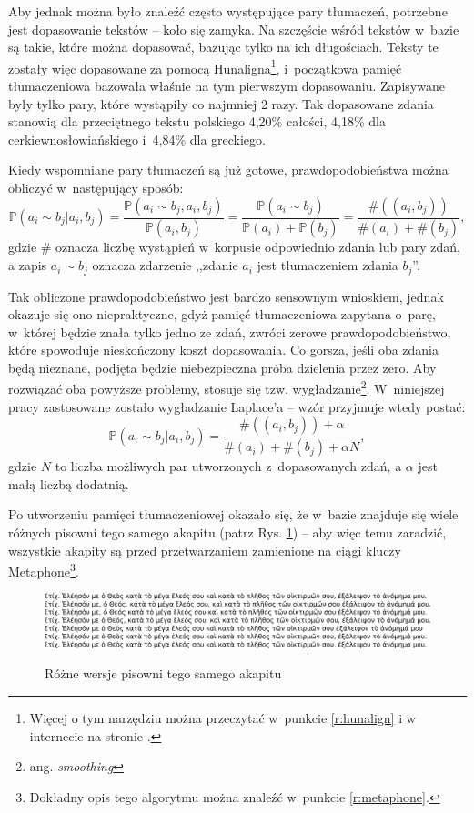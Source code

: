 \documentclass{pracamgr}
\begin{document}
Aby jednak można było znaleźć często występujące pary tłumaczeń,
potrzebne jest dopasowanie tekstów -- koło się zamyka. Na szczęście
wśród tekstów w~bazie są takie, które można dopasować, bazując tylko
na ich długościach. Teksty te zostały więc dopasowane za pomocą
Hunaligna\footnote{Więcej o tym narzędziu można przeczytać w~punkcie
  \ref{r:hunalign} i w internecie na stronie \cite{hunalign}.},
i~początkowa pamięć tłumaczeniowa bazowała właśnie na tym pierwszym
dopasowaniu. Zapisywane były tylko pary, które wystąpiły co najmniej 2
razy. Tak dopasowane zdania stanowią dla przeciętnego tekstu polskiego
4,20\% całości, 4,18\% dla cerkiewno\-{}słowiańskiego i~4,84\% dla
greckiego.

Kiedy wspomniane pary tłumaczeń są już gotowe, prawdopodobieństwa
można obliczyć w~następujący sposób:
$$
\mathbb{P}( a_i \sim b_j | a_i, b_j)
=
\frac{ \mathbb{P}( a_i \sim b_j, a_i, b_j)}
     { \mathbb{P}( a_i, b_j) }
=
\frac{ \mathbb{P}( a_i \sim b_j ) }
     { \mathbb{P}(a_i) +  \mathbb{P}(b_j) }
=
\frac{ \#( (a_i, b_j) ) }
     { \#(a_i) + \#(b_j) } ,
$$
gdzie $\#$ oznacza liczbę wystąpień w~korpusie odpowiednio zdania lub
pary zdań, a zapis $a_i \sim b_j$ oznacza zdarzenie ,,zdanie $a_i$ jest
tłumaczeniem zdania $b_j$''.

Tak obliczone prawdopodobieństwo jest bardzo sensownym wnioskiem,
jednak okazuje się ono niepraktyczne, gdyż pamięć tłumaczeniowa
zapytana o~parę, w~której będzie znała tylko jedno ze zdań, zwróci
zerowe prawdopodobieństwo, które spowoduje nieskończony koszt
dopasowania. Co gorsza, jeśli oba zdania będą nieznane, podjęta będzie
niebezpieczna próba dzielenia przez zero. Aby rozwiązać oba powyższe
problemy, stosuje się
tzw. wygładzanie\footnote{ang. \textit{smoothing}}. W~niniejszej pracy
zastosowane zostało wygładzanie Laplace’a -- wzór przyjmuje wtedy
postać:
$$
\mathbb{P}( a_i \sim b_j | a_i, b_j)
=
\frac{ \#( (a_i, b_j) ) + \alpha }
     { \#(a_i) + \#(b_j) + \alpha N } ,
$$
gdzie $N$ to liczba możliwych par utworzonych z~dopasowanych zdań, a
$\alpha$ jest małą liczbą dodatnią.

Po utworzeniu pamięci tłumaczeniowej okazało się, że w~bazie znajduje
się wiele różnych pisowni tego samego akapitu (patrz
Rys. \ref{fig:pisownia}) -- aby więc temu zaradzić, wszystkie akapity
są przed przetwarzaniem zamienione na ciągi kluczy
Metaphone\footnote{Dokładny opis tego algorytmu można znaleźć w~punkcie
  \ref{r:metaphone}.}.

\begin{figure}[h]
  \small
  \caption{Różne wersje pisowni tego samego akapitu}
  \includegraphics[width=\textwidth]{pisownia.eps}
  \label{fig:pisownia}
\end{figure}
\end{document}
